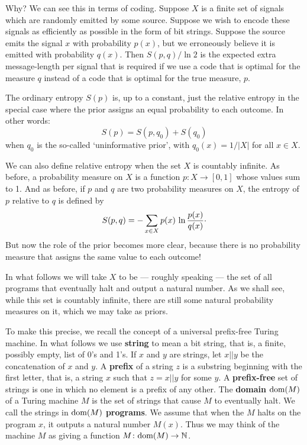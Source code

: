 \documentclass[12pt,twoside,openright]{report}
\newcommand{\maps}{\colon}
\newcommand{\N}{\mathbb{N}}
\newcommand{\dom}{\mbox{\rm dom}}
\begin{document}
Why?  We can see this in terms of coding.  Suppose $X$ is a finite set of signals which are randomly emitted by some source. Suppose we wish to encode these signals as efficiently as possible in the form of bit strings.  Suppose the source emits the signal $x$ with probability $p(x)$, but we erroneously believe it is emitted with probability $q(x)$.  Then $S(p,q)/\ln 2$ is the expected extra message-length per signal that is required if we use a code that is optimal for the measure $q$ instead of a code that is optimal for the true measure, $p$.

The ordinary entropy $S(p)$ is, up to a constant, just the relative entropy in the special case where the prior assigns an equal probability to each outcome.  In other words:
\[  S(p) = S(p,q_0) + S(q_0)  \]
when $q_0$ is the so-called `uninformative prior', with $q_0(x) =
1/|X|$ for all $x \in X$.  

We can also define relative entropy when the set $X$ is countably infinite.  As before, a probability measure on $X$ is a function $p
\maps X \to [0,1]$ whose values sum to 1.  And as before, if $p$ and
$q$ are two probability measures on $X$, the entropy of $p$ relative to $q$ is defined by
\begin{equation}
\label{relative_entropy}
  S(p,q) = -\sum_{x \in X} p(x) \, \ln\frac{p(x)}{q(x)} \raisebox{0.4ex}{.}
\end{equation} 
But now the role of the prior becomes more clear, because there is no probability measure that assigns the same value to each outcome!

In what follows we will take $X$ to be --- roughly speaking --- the set of all programs that eventually halt and output a natural number.  As we shall see, while this set is countably infinite, there are still some natural probability measures on it, which we may take as priors.

To make this precise, we recall the concept of a universal prefix-free Turing machine.  In what follows we use {\bf string} to mean a bit string, that is, a finite, possibly empty, list of 0's and 1's.  If $x$ and $y$ are strings, let $x||y$ be the concatenation of $x$ and $y.$ A \textbf{prefix} of a string $z$ is a substring beginning with the first letter, that is, a string $x$ such that $z = x||y$ for some $y$.  A \textbf{prefix-free} set of strings is one in which no element is a prefix of any other.  The \textbf{domain} $\dom(M)$ of a Turing machine $M$ is the set of strings that cause $M$ to eventually halt.  We call the strings in $\dom(M)$ \textbf{programs}.  We assume that when the $M$ halts on the program
$x$, it outputs a natural number $M(x)$.  Thus we may think of the machine $M$ as giving a function $M \maps \dom(M) \to \N$.
\end{document}

